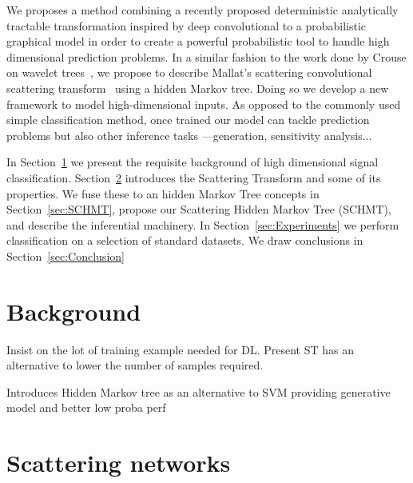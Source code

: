 \documentclass{article}
\begin{document}
  We proposes a method combining a recently proposed deterministic analytically tractable transformation inspired by deep convolutional to a probabilistic graphical model in order to create a powerful probabilistic tool to handle high dimensional prediction problems. In a similar fashion to the work done by Crouse on wavelet trees~\citep{crouse1998wavelet}, we propose to describe Mallat's scattering convolutional scattering transform~\citep{bruna2010classification} using a hidden Markov tree. Doing so we develop a new framework to model high-dimensional inputs. As opposed to the commonly used simple classification method, once trained our model can tackle prediction problems but also other inference tasks ---\eg generation, sensitivity analysis... %

  In  Section~\ref{sec:Background}  we  present  the  requisite  background  of high dimensional signal classification. Section~\ref{sec:SCN} introduces the Scattering Transform and some of its properties.   We  fuse these to an hidden Markov Tree concepts in Section~\ref{sec:SCHMT}, propose our Scattering Hidden Markov Tree (SCHMT), and describe the inferential machinery. In Section~\ref{sec:Experiments} we perform classification on a selection of standard datasets. We draw conclusions in Section~\ref{sec:Conclusion}
	
\section{Background}
  \label{sec:Background}
  Insist on the lot of training example needed for DL. Present ST has an alternative to lower the number of samples required.
  
  Introduces Hidden Markov tree as an alternative to SVM providing generative model and better low proba perf


\section{Scattering networks}
  \label{sec:SCN}

\end{document}
